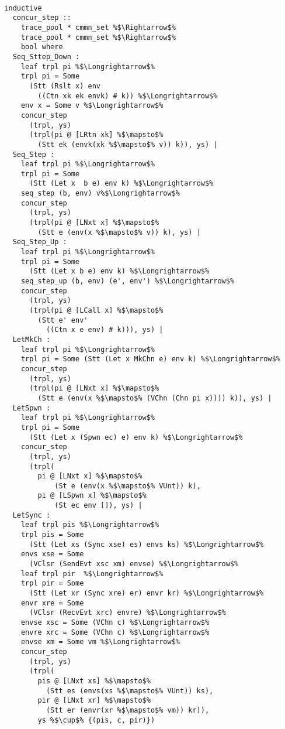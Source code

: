\documentclass{article}
\begin{document}
\begin{lstlisting}[style=codestyle1, escapechar=\%]

  inductive
    concur_step ::
      trace_pool * cmmn_set %$\Rightarrow$%
      trace_pool * cmmn_set %$\Rightarrow$%
      bool where 
    Seq_Sttep_Down :
      leaf trpl pi %$\Longrightarrow$%
      trpl pi = Some
        (Stt (Rslt x) env
          ((Ctn xk ek envk) # k)) %$\Longrightarrow$%
      env x = Some v %$\Longrightarrow$%
      concur_step
        (trpl, ys)
        (trpl(pi @ [LRtn xk] %$\mapsto$%
          (Stt ek (envk(xk %$\mapsto$% v)) k)), ys) |
    Seq_Step :
      leaf trpl pi %$\Longrightarrow$%
      trpl pi = Some
        (Stt (Let x  b e) env k) %$\Longrightarrow$%
      seq_step (b, env) v%$\Longrightarrow$%
      concur_step
        (trpl, ys)
        (trpl(pi @ [LNxt x] %$\mapsto$%
          (Stt e (env(x %$\mapsto$% v)) k), ys) |
    Seq_Step_Up : 
      leaf trpl pi %$\Longrightarrow$%
      trpl pi = Some
        (Stt (Let x b e) env k) %$\Longrightarrow$%
      seq_step_up (b, env) (e', env') %$\Longrightarrow$%
      concur_step
        (trpl, ys)
        (trpl(pi @ [LCall x] %$\mapsto$%
          (Stt e' env'
            ((Ctn x e env) # k))), ys) |
    LetMkCh : 
      leaf trpl pi %$\Longrightarrow$%
      trpl pi = Some (Stt (Let x MkChn e) env k) %$\Longrightarrow$%
      concur_step
        (trpl, ys)
        (trpl(pi @ [LNxt x] %$\mapsto$%
          (Stt e (env(x %$\mapsto$% (VChn (Chn pi x)))) k)), ys) |
    LetSpwn :
      leaf trpl pi %$\Longrightarrow$%
      trpl pi = Some
        (Stt (Let x (Spwn ec) e) env k) %$\Longrightarrow$%
      concur_step
        (trpl, ys)
        (trpl(
          pi @ [LNxt x] %$\mapsto$%
              (St e (env(x %$\mapsto$% VUnt)) k), 
          pi @ [LSpwn x] %$\mapsto$%
              (St ec env []), ys) |
    LetSync :
      leaf trpl pis %$\Longrightarrow$%
      trpl pis = Some
        (Stt (Let xs (Sync xse) es) envs ks) %$\Longrightarrow$%
      envs xse = Some
        (VClsr (SendEvt xsc xm) envse) %$\Longrightarrow$%
      leaf trpl pir  %$\Longrightarrow$%
      trpl pir = Some
        (Stt (Let xr (Sync xre) er) envr kr) %$\Longrightarrow$%
      envr xre = Some
        (VClsr (RecvEvt xrc) envre) %$\Longrightarrow$%
      envse xsc = Some (VChn c) %$\Longrightarrow$%
      envre xrc = Some (VChn c) %$\Longrightarrow$%
      envse xm = Some vm %$\Longrightarrow$%
      concur_step
        (trpl, ys)
        (trpl(
          pis @ [LNxt xs] %$\mapsto$%
            (Stt es (envs(xs %$\mapsto$% VUnt)) ks), 
          pir @ [LNxt xr] %$\mapsto$%
            (Stt er (envr(xr %$\mapsto$% vm)) kr)), 
          ys %$\cup$% {(pis, c, pir)})

  \end{lstlisting}
\end{document}
